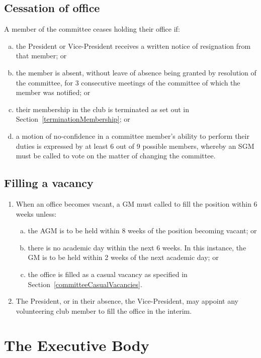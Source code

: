 \documentclass{constitution}
\begin{document}
\subsection{Cessation of office}
A member of the committee ceases holding their office if:
\begin{enumerate}[(a)]
    \item the President or Vice-President receives a written notice of resignation from that member; or
    \item the member is absent, without leave of absence being granted by resolution of the committee, for 3 consecutive meetings of the committee of which the member was notified; or
    \item their membership in the club is terminated as set out in Section~\ref{terminationMembership}; or
    \item a motion of no-confidence in a committee member's ability to perform their duties is expressed by at least 6 out of 9 possible members, whereby an SGM must be called to vote on the matter of changing the committee. %
\end{enumerate}

\subsection{Filling a vacancy}
\begin{enumerate}[(1)]
    \item When an office becomes vacant, a GM must called to fill the position within 6 weeks unless:
          \begin{enumerate}[(a)]
              \item the AGM is to be held within 8 weeks of the position becoming vacant; or
              \item there is no academic day within the next 6 weeks. In this instance, the GM is to be held within 2 weeks of the next academic day; or
              \item the office is filled as a casual vacancy as specified in Section~\ref{committeeCasualVacancies}.
          \end{enumerate}
    \item The President, or in their absence, the Vice-President, may appoint any volunteering club member to fill the office in the interim.
\end{enumerate}

\section{The Executive Body}
\end{document}
